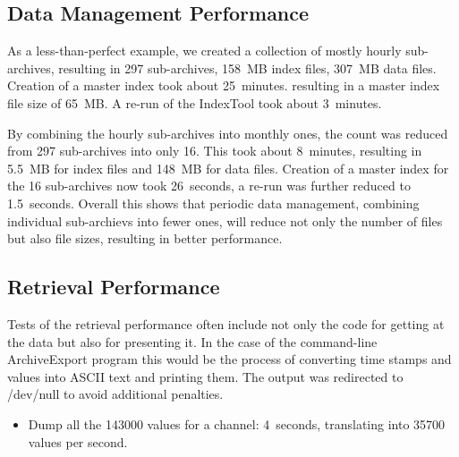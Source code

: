 \subsection{Data Management Performance}
As a less-than-perfect example, we created a collection of mostly
hourly sub-archives, resulting in 297 sub-archives, 158~MB index
files, 307~MB data files.  Creation of a master index took about
25~minutes.  resulting in a master index file size of 65~MB.  A re-run
of the IndexTool took about 3~minutes.

By combining the hourly sub-archives into monthly ones, the count was
reduced from 297 sub-archives into only 16.  This took about
8~minutes, resulting in 5.5~MB for index files and 148~MB for data
files. Creation of a master index for the 16 sub-archives now took
26~seconds, a re-run was further reduced to 1.5~seconds.
Overall this shows that periodic data management, combining individual
sub-archievs into fewer ones, will reduce not only the number of files
but also file sizes, resulting in better performance.

\subsection{Retrieval Performance}
Tests of the retrieval performance often include not only the
code for getting at the data but also for presenting it. In the
case of the command-line ArchiveExport program this would be the process
of converting time stamps and values into ASCII text and printing them.
The output was redirected to /dev/null to avoid additional penalties.

\begin{itemize}
\item Dump all the 143000 values for a channel: 4~seconds,
      translating into 35700 values per second.
\end{itemize}
